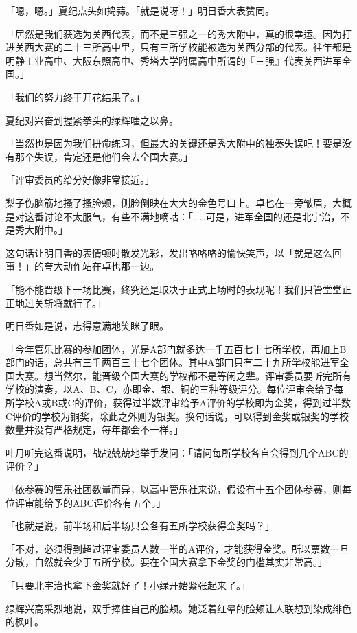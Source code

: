 \documentclass[UTF8]{ctexart}
\begin{document}
    「嗯，嗯。」夏纪点头如捣蒜。「就是说呀！」明日香大表赞同。 

    「居然是我们获选为关西代表，而不是三强之一的秀大附中，真的很幸运。因为打进关西大赛的二十三所高中里，只有三所学校能被选为关西分部的代表。往年都是明静工业高中、大阪东照高中、秀塔大学附属高中所谓的『三强』代表关西进军全国。」 

    「我们的努力终于开花结果了。」 

    夏纪对兴奋到握紧拳头的绿辉嗤之以鼻。 

    「当然也是因为我们拼命练习，但最大的关键还是秀大附中的独奏失误吧！要是没有那个失误，肯定还是他们会去全国大赛。」 

    「评审委员的给分好像非常接近。」 

    梨子伤脑筋地搔了搔脸颊，侧脸倒映在大大的金色号口上。卓也在一旁皱眉，大概是对这番讨论不太服气，有些不满地嘀咕：「……可是，进军全国的还是北宇治，不是秀大附中。」 

    这句话让明日香的表情顿时散发光彩，发出咯咯咯的愉快笑声，以「就是这么回事！」的夸大动作站在卓也那一边。 

    「能不能晋级下一场比赛，终究还是取决于正式上场时的表现呢！我们只管堂堂正正地过关斩将就行了。」 

    明日香如是说，志得意满地笑眯了眼。 

    「今年管乐比赛的参加团体，光是A部门就多达一千五百七十七所学校，再加上B部门的话，总共有三千两百三十七个团体。其中A部门只有二十九所学校能进军全国大赛。想当然尔，能晋级全国大赛的学校都不是等闲之辈。评审委员要听完所有学校的演奏，以A、B、C，亦即金、银、铜的三种等级评分。每位评审会给予每所学校A或B或C的评价，获得过半数评审给予A评价的学校即为金奖，得到过半数C评价的学校为铜奖，除此之外则为银奖。换句话说，可以得到金奖或银奖的学校数量并没有严格规定，每年都会不一样。」 

    叶月听完这番说明，战战兢兢地举手发问：「请问每所学校各自会得到几个ABC的评价？」 

    「依参赛的管乐社团数量而异，以高中管乐社来说，假设有十五个团体参赛，则每位评审能给予的ABC评价各有五个。」 

    「也就是说，前半场和后半场只会各有五所学校获得金奖吗？」 

    「不对，必须得到超过评审委员人数一半的A评价，才能获得金奖。所以票数一旦分散，自然就会少于五所学校。要在全国大赛拿下金奖的门槛其实非常高。」 

    「只要北宇治也拿下金奖就好了！小绿开始紧张起来了。」 

    绿辉兴高采烈地说，双手捧住自己的脸颊。她泛着红晕的脸颊让人联想到染成绯色的枫叶。 
\end{document}
